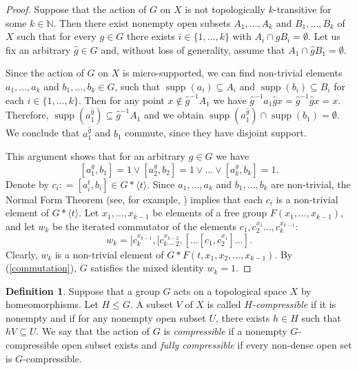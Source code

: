 \documentclass[11pt,letterpaper]{article}
\newcommand{\NN}{\mathbb{N}}
\renewcommand{\l}{\langle}
\renewcommand{\r}{\rangle}
\DeclareMathOperator{\supp}{supp}
\theoremstyle{definition}
\newtheorem{defn}[thm]{Definition}
\theoremstyle{remark}
\begin{document}
\begin{proof}
    Suppose that the action of $G$ on $X$ is not topologically $k$-transitive for some $k \in \NN$.
Then there exist nonempty open subsets $A_1, \ldots, A_k$ and $B_1, \ldots, B_k$ of $X$ such that for every $g \in G$ there exists  $i \in \{1, \ldots, k \}$ with  $A_i \cap gB_i = \emptyset$.  Let us fix an arbitrary $\widehat{g} \in G$ and, without loss of generality, assume that $A_1 \cap \widehat{g}B_1 = \emptyset$.
    
     Since the action of $G$ on $X$ is micro-supported, we can find non-trivial elements $a_1, \ldots, a_k$ and $b_1, \ldots, b_k \in G$, such that $\supp(a_i) \subseteq A_i$ and $\supp(b_i) \subseteq B_i$ for each $i \in \{1, \ldots, k \}$.
    Then for any point $x \notin \widehat{g}^{-1}A_1$ we have $\widehat{g}^{-1}a_1\widehat{g}x = \widehat{g}^{-1}\widehat{g}x = x$. Therefore, $\supp(a_1^{\widehat{g}}) \subseteq \widehat{g}^{-1}A_1$ and we obtain $\supp(a_1^{\widehat{g}}) \cap \supp(b_1) = \emptyset$. We conclude that $a_1^{\widehat{g}}$ and $b_1$ commute, since they have disjoint support. 

This argument shows that for an arbitrary $g \in G$ we have
    \begin{equation} \label{commutation}
        [a_1^g, b_1]=1 \lor [a_2^g, b_2]=1 \lor \ldots \lor [a_k^g, b_k]=1.
    \end{equation}
    Denote by $c_i : = [a_i^t, b_i] \in G*\l t \rangle$.  Since $a_1, \ldots, a_k$ and $b_1, \ldots, b_k$ are non-trivial, the Normal Form Theorem (see, for example, \cite[Theorem 1.2, Chapter 4]{LS}) implies that each $c_i$ is a non-trivial element of $G* \l t \r $. 
    Let $x_1, \dots, x_{k-1}$ be elements of a free group $F(x_1, \dots, x_{k-1})$,
    and let $w_k$ be the iterated commutator of the elements $c_1, c_2^{x_1}\ldots, c_k^{x_{k-1}}$:
    $$
        w_k=[c_k^{x_{k-1}},[c_{k-2}^{x_{k-2}},[\ldots[c_{1},c_2^{x_1}]\ldots].
    $$
   Clearly, $w_k$ is a non-trivial element of $G* F(t,x_1,x_2, \dots, x_{k-1})$. By (\ref{commutation}), $G$ satisfies the mixed identity $w_k=1$.
    \end{proof}

\begin{defn}
Suppose that a group $G$ acts on a topological space $X$ by homeomorphisms. Let $H \leq G$. A subset $V$ of $X$ is called {\it $H$-compressible} if it is nonempty and if for any nonempty open subset $U$, there exists $h \in H$ such that $hV \subseteq U$. We say that the action of $G$ is {\it compressible} if a nonempty $G$-compressible open subset exists and {\it fully compressible} if every non-dense open set is $G$-compressible.
\end{defn}
\end{document}
